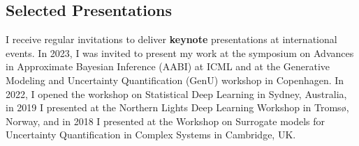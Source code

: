 \documentclass[oneside, a4paper, onecolumn, 10pt]{article}
\begin{document}








\subsection*{Selected Presentations}

I receive regular invitations to deliver {\bf keynote} presentations at international events. 
In 2023, I was invited to present my work at the symposium on Advances in Approximate Bayesian Inference (AABI) at ICML and at the Generative Modeling and Uncertainty Quantification (GenU) workshop in Copenhagen. 
In 2022, I opened the workshop on Statistical Deep Learning in Sydney, Australia, in 2019 I presented at the Northern Lights Deep Learning Workshop in Troms\o, Norway, and in 2018 I presented at the Workshop on Surrogate models for Uncertainty Quantification in Complex Systems in Cambridge, UK.
\end{document}
